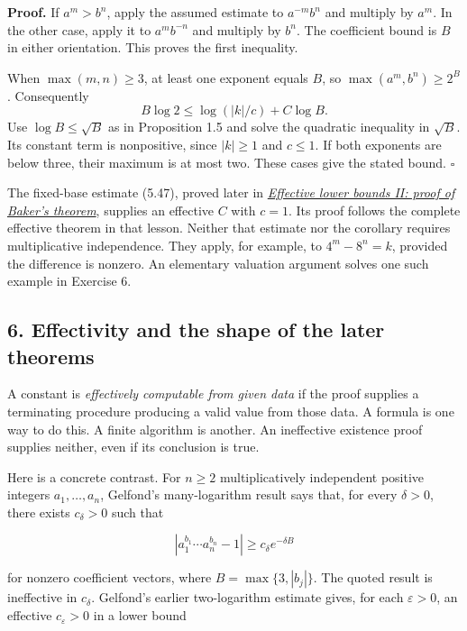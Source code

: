 \documentclass[
  11pt,
  a4paper,
]{article}
\begin{document}
\textbf{Proof.} If \(a^m>b^n\), apply the assumed estimate to
\(a^{-m}b^n\) and multiply by \(a^m\). In the other case, apply it to
\(a^m b^{-n}\) and multiply by \(b^n\). The coefficient bound is \(B\)
in either orientation. This proves the first inequality.

When \(\max(m,n)\ge3\), at least one exponent equals \(B\), so
\(\max(a^m,b^n)\ge2^B\). Consequently \[
B\log2\le\log(|k|/c)+C\log B.
\] Use \(\log B\le\sqrt B\) as in Proposition 1.5 and solve the
quadratic inequality in \(\sqrt B\). Its constant term is nonpositive,
since \(|k|\ge1\) and \(c\le1\). If both exponents are below three,
their maximum is at most two. These cases give the stated bound.
\(\square\)

The fixed-base estimate (5.47), proved later in
\href{https://kokunoyumeto.github.io/open-math-courses-public/courses/TR-BAKER/TR-BAKER-05.html\#10-consequences-and-later-refinements}{\emph{Effective
lower bounds II: proof of Baker's theorem}}, supplies an effective \(C\)
with \(c=1\). Its proof follows the complete effective theorem in that
lesson. Neither that estimate nor the corollary requires multiplicative
independence. They apply, for example, to \(4^m-8^n=k\), provided the
difference is nonzero. An elementary valuation argument solves one such
example in Exercise 6.

\subsection{6. Effectivity and the shape of the later
theorems}\label{effectivity-and-the-shape-of-the-later-theorems}

A constant is \emph{effectively computable from given data} if the proof
supplies a terminating procedure producing a valid value from those
data. A formula is one way to do this. A finite algorithm is another. An
ineffective existence proof supplies neither, even if its conclusion is
true.

Here is a concrete contrast. For \(n\ge2\) multiplicatively independent
positive integers \(a_1,\ldots,a_n\), Gelfond's many-logarithm result
says that, for every \(\delta>0\), there exists \(c_\delta>0\) such that

\[
|a_1^{b_1}\cdots a_n^{b_n}-1|\ge c_\delta e^{-\delta B}
\]

for nonzero coefficient vectors, where \(B=\max\{3,|b_j|\}\). The quoted
result is ineffective in \(c_\delta\). Gelfond's earlier two-logarithm
estimate gives, for each \(\varepsilon>0\), an effective
\(c_\varepsilon>0\) in a lower bound
\end{document}

